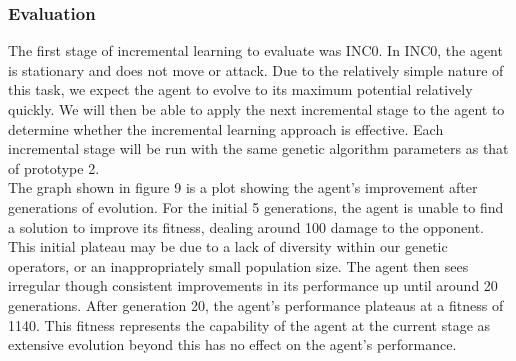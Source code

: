 \documentclass[12pt,a4paper]{article}
\begin{document}
\newpage
\onehalfspace
\subsubsection{Evaluation}
The first stage of incremental learning to evaluate was INC0. In INC0, the agent is stationary and does not move or attack. Due to the relatively simple nature of this task, we expect the agent to evolve to its maximum potential relatively quickly. We will then be able to apply the next incremental stage to the agent to determine whether the incremental learning approach is effective. Each incremental stage will be run with the same genetic algorithm parameters as that of prototype 2.\\

The graph shown in figure 9 is a plot showing the agent's improvement after generations of evolution. For the initial 5 generations, the agent is unable to find a solution to improve its fitness, dealing around 100 damage to the opponent. This initial plateau may be due to a lack of diversity within our genetic operators, or an inappropriately small population size. The agent then sees irregular though consistent improvements in its performance up until around 20 generations. After generation 20, the agent's performance plateaus at a fitness of 1140. This fitness represents the capability of the agent at the current stage as extensive evolution beyond this has no effect on the agent's performance. \\
\end{document}
